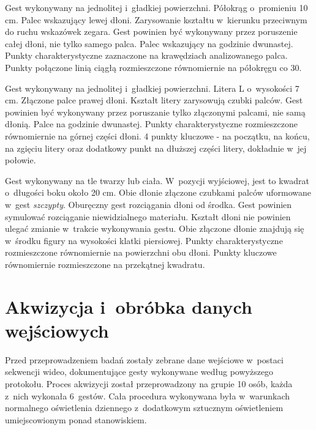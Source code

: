     \newpage
         {Gest wykonywany na jednolitej i~gładkiej powierzchni.}
         {Półokrąg o~promieniu 10 cm.}
         {Palec wskazujący lewej dłoni.}
         {Zarysowanie kształtu w~kierunku przeciwnym do ruchu wskazówek zegara.}
         {Gest powinien być wykonywany przez poruszenie całej dłoni, nie tylko samego palca.}
         {Palec wskazujący na godzinie dwunastej.}
         {Punkty charakterystyczne zaznaczone na krawędziach analizowanego palca.}
         {Punkty połączone linią ciągłą rozmieszczone równomiernie na półokręgu co 30\degree.}

         {Gest wykonywany na jednolitej i~gładkiej powierzchni.}
         {Litera L o~wysokości 7 cm.}
         {Złączone palce prawej dłoni.}
         {Kształt litery zarysowują czubki palców.}
         {Gest powinien być wykonywany przez poruszanie tylko złączonymi palcami, nie samą dłonią.}
         {Palce na godzinie dwunastej.}
         {Punkty charakterystyczne rozmieszczone równomiernie na górnej części dłoni.}
         {4 punkty kluczowe - na początku, na końcu, na zgięciu litery oraz dodatkowy punkt na dłuższej części litery, dokładnie w~jej połowie.}

    \newpage
         {Gest wykonywany na tle twarzy lub ciała.}
         {W~pozycji wyjściowej, jest to kwadrat o~długości boku około 20 cm.}
         {Obie dłonie złączone czubkami palców uformowane w~gest \textit{szczypty}.}
         {Oburęczny gest rozciągania dłoni od środka.}
         {Gest powinien symulować rozciąganie niewidzialnego materiału. Kształt dłoni nie powinien ulegać zmianie w~trakcie wykonywania gestu.}
         {Obie złączone dłonie znajdują się w~środku figury na wysokości klatki piersiowej.}
         {Punkty charakterystyczne rozmieszczone równomiernie na powierzchni obu dłoni.}
         {Punkty kluczowe równomiernie rozmieszczone na przekątnej kwadratu.}

  \section{Akwizycja i~obróbka danych wejściowych}\label{Section_Akwizycja}

    Przed przeprowadzeniem badań zostały zebrane dane wejściowe w~postaci sekwencji wideo, dokumentujące gesty wykonywane według powyższego protokołu. Proces akwizycji został przeprowadzony na grupie 10 osób, każda z~nich wykonała 6~gestów. Cała procedura wykonywana była w~warunkach normalnego oświetlenia dziennego z~dodatkowym sztucznym oświetleniem umiejscowionym ponad stanowiskiem.

